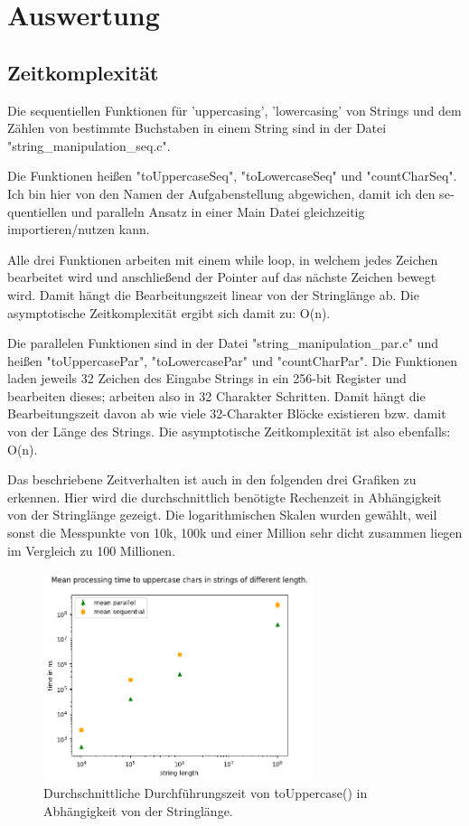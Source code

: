 \documentclass[plainarticle,zihtitle,german,final,hyperref,utf8]{zihpub}
\begin{document}
\section{Auswertung}
\subsection{Zeitkomplexität}
Die se­quen­ti­ellen Funktionen für 'uppercasing', 'lowercasing' von Strings und dem Zählen von bestimmte Buchstaben in einem String sind in der Datei "string\_manipulation\_seq.c".

Die Funktionen heißen "toUppercaseSeq", "toLowercaseSeq" und "countCharSeq". Ich bin hier von den Namen der Aufgabenstellung abgewichen, damit ich den se­quen­ti­ellen und paralleln Ansatz in einer Main Datei gleichzeitig importieren/nutzen kann.

Alle drei Funktionen arbeiten mit einem while loop, in welchem jedes Zeichen bearbeitet wird und anschließend der Pointer auf das nächste Zeichen bewegt wird. Damit hängt die Bearbeitungszeit linear von der Stringlänge ab. Die asymptotische Zeitkomplexität ergibt sich damit zu: O(n).
\newline

Die parallelen Funktionen sind in der Datei "string\_manipulation\_par.c" und heißen "toUppercasePar", "toLowercasePar" und "countCharPar".
Die Funktionen laden jeweils 32 Zeichen des Eingabe Strings in ein 256-bit Register und bearbeiten dieses; arbeiten also in 32 Charakter Schritten.
Damit hängt die Bearbeitungszeit davon ab wie viele 32-Charakter Blöcke existieren bzw. damit von der Länge des Strings. Die asymptotische Zeitkomplexität ist also ebenfalls: O(n).
\newline

Das beschriebene Zeitverhalten ist auch in den folgenden drei Grafiken zu erkennen.
Hier wird die durchschnittlich benötigte Rechenzeit in Abhängigkeit von der Stringlänge gezeigt.
Die logarithmischen Skalen wurden gewählt, weil sonst die Messpunkte von 10k, 100k und einer Million sehr dicht zusammen liegen im Vergleich zu 100 Millionen.


\begin{figure}[h]
	\begin{center}
		\includegraphics[width=0.7\textwidth]{images/complex_upper.png}
		\caption{Durchschnittliche Durchführungszeit von toUppercase() in Abhängigkeit von der Stringlänge.}
		\label{fig:mean_upper}
	\end{center}
\end{figure}
\end{document}
